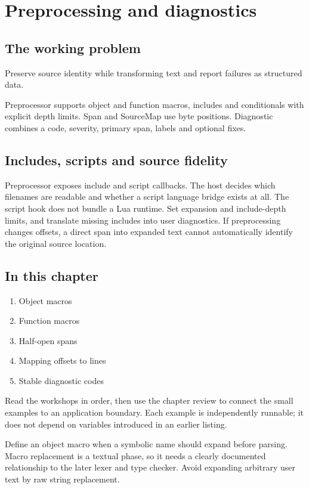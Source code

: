 \chapter{Preprocessing and diagnostics}\label{ch:11}
\section*{The working problem}
Preserve source identity while transforming text and report failures as structured data.

Preprocessor supports object and function macros, includes and conditionals with explicit depth limits. Span and SourceMap use byte positions. Diagnostic combines a code, severity, primary span, labels and optional fixes.

\section*{Includes, scripts and source fidelity}
Preprocessor exposes include and script callbacks. The host decides which filenames are readable and whether a script language bridge exists at all. The script hook does not bundle a Lua runtime. Set expansion and include-depth limits, and translate missing includes into user diagnostics. If preprocessing changes offsets, a direct span into expanded text cannot automatically identify the original source location.

\section*{In this chapter}
\begin{enumerate}
\item Object macros
\item Function macros
\item Half-open spans
\item Mapping offsets to lines
\item Stable diagnostic codes
\end{enumerate}
Read the workshops in order, then use the chapter review to connect the small examples to an application boundary. Each example is independently runnable; it does not depend on variables introduced in an earlier listing.

\clearpage
{}
Define an object macro when a symbolic name should expand before parsing. Macro replacement is a textual phase, so it needs a clearly documented relationship to the later lexer and type checker. Avoid expanding arbitrary user text by raw string replacement.

